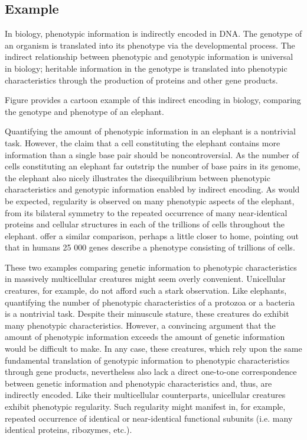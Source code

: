 \subsection{Example}
In biology, phenotypic information is indirectly encoded in DNA. The genotype of an organism is translated into its phenotype via the developmental process. The indirect relationship between phenotypic and genotypic information is universal in biology; heritable information in the genotype is translated into phenotypic characteristics through the production of proteins and other gene products.

Figure  provides a cartoon example of this indirect encoding in biology, comparing the genotype and phenotype of an elephant.

Quantifying the amount of phenotypic information in an elephant is a nontrivial task. However, the claim that a cell constituting the elephant contains more information than a single base pair should be noncontroversial. As the number of cells constituting an elephant far outstrip the number of base pairs in its genome, the elephant also nicely illustrates the disequilibrium between phenotypic characteristics and genotypic information enabled by indirect encoding. As would be expected, regularity is observed on many phenotypic aspects of the elephant, from its bilateral symmetry to the repeated occurrence of many near-identical proteins and cellular structures in each of the trillions of cells throughout the elephant. \cite{Clune2011OnRegularity} offer a similar comparison, perhaps a little closer to home, pointing out that in humans 25 000 genes describe a phenotype consisting of trillions of cells.
 
These two examples comparing genetic information to phenotypic characteristics in massively multicellular creatures might seem overly convenient. Unicellular creatures, for example, do not afford such a stark observation. Like elephants, quantifying the number of phenotypic characteristics of a protozoa or a bacteria is a nontrivial task. Despite their minuscule stature, these creatures do exhibit many phenotypic characteristics. However, a convincing argument that the amount of phenotypic information exceeds the amount of genetic information would be difficult to make. In any case, these creatures, which rely upon the same fundamental translation of genotypic information to phenotypic characteristics through gene products, nevertheless also lack a direct one-to-one correspondence between genetic information and phenotypic characteristics and, thus, are indirectly encoded. Like their multicellular counterparts, unicellular creatures exhibit phenotypic regularity.
Such regularity might manifest in, for example, repeated occurrence of identical or near-identical functional subunits (i.e. many identical proteins, ribozymes, etc.).

